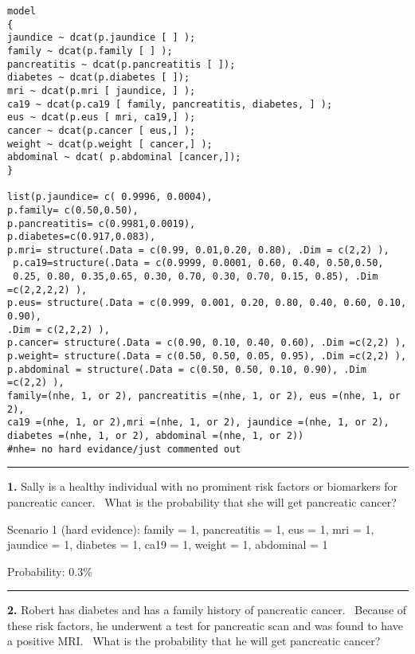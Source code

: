 \documentclass[12pt]{article}
\newcommand{\onef}[3]{
\begin{center}~
{\psfig{figure=#1,width=#2,height=#3}}
\vskip -0.15truein
\end{center}}
\begin{document}
{\small
\begin{verbatim}
model
{
jaundice ~ dcat(p.jaundice [ ] );
family ~ dcat(p.family [ ] );
pancreatitis ~ dcat(p.pancreatitis [ ]);
diabetes ~ dcat(p.diabetes [ ]);
mri ~ dcat(p.mri [ jaundice, ] );
ca19 ~ dcat(p.ca19 [ family, pancreatitis, diabetes, ] );
eus ~ dcat(p.eus [ mri, ca19,] );
cancer ~ dcat(p.cancer [ eus,] );
weight ~ dcat(p.weight [ cancer,] );
abdominal ~ dcat( p.abdominal [cancer,]);
}

list(p.jaundice= c( 0.9996, 0.0004),
p.family= c(0.50,0.50),
p.pancreatitis= c(0.9981,0.0019),
p.diabetes=c(0.917,0.083),
p.mri= structure(.Data = c(0.99, 0.01,0.20, 0.80), .Dim = c(2,2) ),
 p.ca19=structure(.Data = c(0.9999, 0.0001, 0.60, 0.40, 0.50,0.50,
 0.25, 0.80, 0.35,0.65, 0.30, 0.70, 0.30, 0.70, 0.15, 0.85), .Dim =c(2,2,2,2) ),
p.eus= structure(.Data = c(0.999, 0.001, 0.20, 0.80, 0.40, 0.60, 0.10, 0.90),
.Dim = c(2,2,2) ),
p.cancer= structure(.Data = c(0.90, 0.10, 0.40, 0.60), .Dim =c(2,2) ),
p.weight= structure(.Data = c(0.50, 0.50, 0.05, 0.95), .Dim =c(2,2) ),
p.abdominal = structure(.Data = c(0.50, 0.50, 0.10, 0.90), .Dim =c(2,2) ),
family=(nhe, 1, or 2), pancreatitis =(nhe, 1, or 2), eus =(nhe, 1, or 2),
ca19 =(nhe, 1, or 2),mri =(nhe, 1, or 2), jaundice =(nhe, 1, or 2),
diabetes =(nhe, 1, or 2), abdominal =(nhe, 1, or 2))
#nhe= no hard evidance/just commented out
\end{verbatim}
}


\vspace*{0.2in}
\hrule
\vspace*{0.2in}

{\bf 1.}
Sally is a healthy individual with no prominent risk factors or biomarkers for pancreatic cancer.  What is the probability that she will get pancreatic cancer?

Scenario 1 (hard evidence):
family = 1, pancreatitis = 1, eus = 1, mri = 1, jaundice = 1, diabetes = 1, ca19 = 1, weight = 1, abdominal = 1

Probability: 0.3\%


\vspace*{0.2in}
\hrule
\vspace*{0.2in}



{\bf 2.}
Robert has diabetes and has a family history of pancreatic cancer.  Because of these risk factors, he underwent a test for pancreatic scan and was found to have a positive MRI.  What is the probability that he will get pancreatic cancer?
\end{document}

